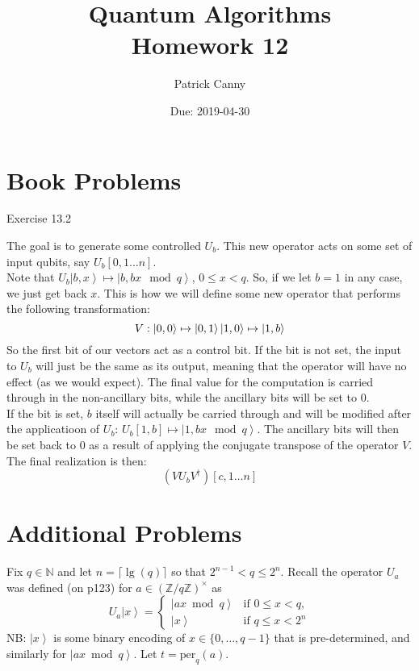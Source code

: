 \documentclass{exam} %
\newcommand{\NN}{\mathbb{N}}
\newcommand{\ZZ}{\mathbb{Z}}
\theoremstyle{plain}
\theoremstyle{definition}
\theoremstyle{remark}
\numberwithin{equation}{section}  %
\newcommand{\ket}[1]{ \left| #1 \right> }
\newcommand{\per}{\text{per}}
\begin{document}
  
\printanswers
\title{Quantum Algorithms \\ Homework 12}
\author{Patrick Canny}
\date{Due: 2019-04-30}
\maketitle
\thispagestyle{foot}
\section {Book Problems}
\begin{questions}
  \question Exercise 13.2\\
  \begin{solution}
    The goal is to generate some controlled $U_b$. This new operator acts on 
    some set of input qubits, say $U_b[0, 1\hdots n]$.\\

    Note that $U_b \ket{b, x} \mapsto \ket{b, bx\mod q}$, $0\leq x < q$.
    So, if we let $b = 1$ in any case, we just get back $x$. This is how we 
    will define some new operator that performs the following transformation:
    \[
      V: \ket{0,0} \mapsto \ket{0,1}\vspace{5mm}\ket{1,0} \mapsto \ket{1,b}
    \]
    So the first bit of our vectors act as a control bit. If the bit is not set,
    the input to $U_b$ will just be the same as its output, meaning that
    the operator will have no effect (as we would expect). The final value for
    the computation is carried through in the non-ancillary bits, while the
    ancillary bits will be set to 0.\\

    If the bit is set, $b$ itself will actually be carried through and will be
    modified after the applicatioon of $U_b$: $U_b[1, b] \mapsto \ket{1, bx\mod q}$.
    The ancillary bits will then be set back to 0 as a result of applying the
    conjugate transpose of the operator $V$. The final realization is then:
    \[
      (VU_bV^\dagger)[c, 1\hdots n]
    \]
  \end{solution}
\end{questions}
\section {Additional Problems}
Fix $q\in \NN$ and let $n = \lceil \lg(q) \rceil$ so that $2^{n-1} < q \leq
2^n$. Recall the operator $U_a$ was defined (on p123) for $a\in
(\ZZ/q\ZZ)^\times$ as
\[
  U_a \ket{x} 
  = \begin{cases}
    \ket{ax \bmod q} & \text{if } 0\leq x < q, \\
    \ket{x}          & \text{if } q\leq x < 2^n
  \end{cases}
\]
NB: $\ket{x}$ is some binary encoding of $x\in \{0,\dots, q-1\}$ that is
pre-determined, and similarly for $\ket{ax \bmod q}$. Let $t = \per_q(a)$.
\end{document}
